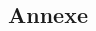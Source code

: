 \documentclass[a4paper, 12pt]{report}
\begin{document}
\begin{spacing}{1.3}
\newpage

\newpage
\textcolor{colortitre1}{\section*{Annexe}}   

	
	
	\end{spacing}
\end{document}

